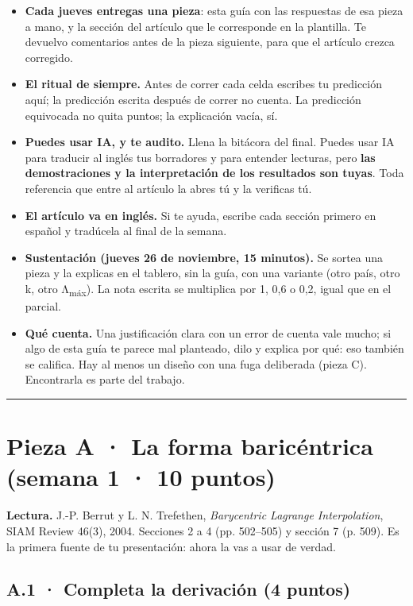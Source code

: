 \begin{itemize}
\tightlist
\item \textbf{Cada jueves entregas una pieza}: esta guía con las respuestas de esa pieza a mano, y la sección del artículo que le corresponde en la plantilla. Te devuelvo comentarios antes de la pieza siguiente, para que el artículo crezca corregido.
\item \textbf{El ritual de siempre.} Antes de correr cada celda escribes tu predicción aquí; la predicción escrita después de correr no cuenta. La predicción equivocada no quita puntos; la explicación vacía, sí.
\item \textbf{Puedes usar IA, y te audito.} Llena la bitácora del final. Puedes usar IA para traducir al inglés tus borradores y para entender lecturas, pero \textbf{las demostraciones y la interpretación de los resultados son tuyas}. Toda referencia que entre al artículo la abres tú y la verificas tú.
\item \textbf{El artículo va en inglés.} Si te ayuda, escribe cada sección primero en español y tradúcela al final de la semana.
\item \textbf{Sustentación (jueves 26 de noviembre, 15 minutos).} Se sortea una pieza y la explicas en el tablero, sin la guía, con una variante (otro país, otro k, otro Λ\textsubscript{máx}). La nota escrita se multiplica por 1, 0,6 o 0,2, igual que en el parcial.
\item \textbf{Qué cuenta.} Una justificación clara con un error de cuenta vale mucho; si algo de esta guía te parece mal planteado, dilo y explica por qué: eso también se califica. Hay al menos un diseño con una fuga deliberada (pieza C). Encontrarla es parte del trabajo.
\end{itemize}

\begin{center}\rule{0.5\linewidth}{0.5pt}\end{center}

\section{Pieza A · La forma baricéntrica (semana 1 · 10 puntos)}

\textbf{Lectura.} J.-P. Berrut y L. N. Trefethen, \emph{Barycentric Lagrange Interpolation}, SIAM Review 46(3), 2004. Secciones 2 a 4 (pp. 502--505) y sección 7 (p. 509). Es la primera fuente de tu presentación: ahora la vas a usar de verdad.

\subsection{A.1 · Completa la derivación (4 puntos)}

